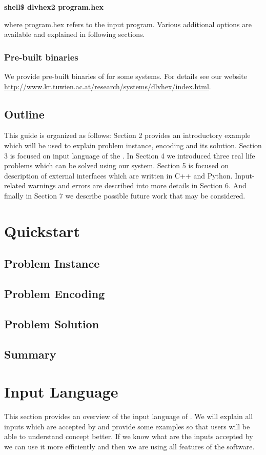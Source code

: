 \documentclass[14pt,a4paper, titlepage]{article}
\begin{document}
\centerline{\textbf{shell\$ dlvhex2 program.hex}} where program.hex refers to the input program. Various additional options are available and explained in following sections.    

\subsubsection{Pre-built binaries}
We provide pre-built binaries of \dlvhex{} for some systems. For details see our website \url{http://www.kr.tuwien.ac.at/research/systems/dlvhex/index.html}. 


\subsection{Outline}
This guide is organized as follows: Section 2 provides an introductory example which will be used to explain problem instance, encoding and its solution. Section 3 is focused on input language of the \dlvhex{}. In Section 4 we introduced three real life problems which can be solved using our system. Section 5 is focused on description of external interfaces which are written in C++ and Python. Input-related warnings and errors are described into more details in Section 6. And finally in Section 7 we describe possible future work that may be considered.

\section{Quickstart} %



\subsection{Problem Instance}
\subsection{Problem Encoding}
\subsection{Problem Solution}
\subsection{Summary}

\newpage
\section{Input Language}%
This section provides an overview of the input language of \dlvhex{}. We will explain all inputs which are accepted by \dlvhex{} and provide some examples so that users will be able to understand concept better. If we know what are the inputs accepted by \dlvhex{} we can use it more efficiently and then we are using all features of the software.  
\end{document}

